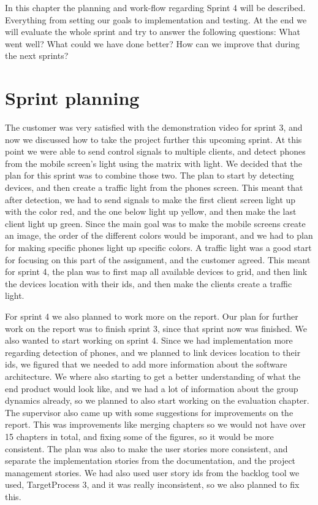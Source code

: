 In this chapter the planning and work-flow regarding Sprint 4 will be described. 
Everything from setting our goals to implementation and testing. At the end we will evaluate the whole sprint and try to answer the following questions: What went well? What could we have done better? How can we improve that during the next sprints? 

\section{Sprint planning}

The customer was very satisfied with the demonstration video for sprint 3, and now we discussed how to take the project further this upcoming sprint. At this point we were able to send control signals to multiple clients, and detect phones from the mobile screen's light using the matrix with light. We decided that the plan for this sprint was to combine those two. The plan to start by detecting devices, and then create a traffic light from the phones screen. This meant that after detection, we had to send signals to make the first client screen light up with the color red, and  the one below light up yellow, and then make the last client light up green. Since the main goal was to make the mobile screens create an image, the order of the different colors would be imporant, and we had to plan for making specific phones light up specific colors. A traffic light was a good start for focusing on this part of the assignment, and the customer agreed. This meant for sprint 4, the plan was to first map all available devices to grid, and then link the devices location with their ids, and then make the clients create a traffic light.  


For sprint 4 we also planned to work more on the report. Our plan for further work on the report was to finish sprint 3, since that sprint now was finished. We also wanted to start working on sprint 4. Since we had implementation more regarding detection of phones, and we planned to link devices location to their ids, we figured that we needed to add more information about the software architecture. We where also starting to get a better understanding of what the end product would look like, and we had a lot of information about the group dynamics already, so we planned to also start working on the evaluation chapter. The supervisor also came up with some suggestions for improvements on the report. This was improvements like merging chapters so we would not have over 15 chapters in total, and fixing some of the figures, so it would be more consistent. The plan was also to make the user stories more consistent, and separate the implementation stories from the documentation, and the project management stories. We had also used user story ids from the backlog tool we used, TargetProcess 3, and it was really inconsistent, so we also planned to fix this. 

